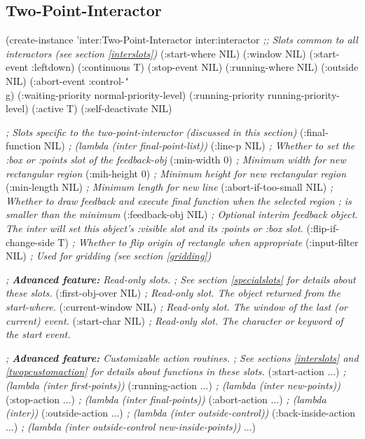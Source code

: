 \begin{group}
\section{Two-Point-Interactor}
\label{twopoint}

\begin{programexample}
(create-instance 'inter:Two-Point-Interactor inter:interactor
  {\it ;; Slots common to all interactors (see section \ref{interslots})}
  (:start-where NIL)
  (:window NIL)
  (:start-event :leftdown)
  (:continuous T)
  (:stop-event NIL)
  (:running-where NIL)
  (:outside NIL)
  (:abort-event :control-{\tt\char`\\}g)
  (:waiting-priority normal-priority-level)
  (:running-priority running-priority-level)
  (:active T)
  (:self-deactivate NIL)

  {\it ; Slots specific to the two-point-interactor (discussed in this section)}
  (:final-function NIL)      {\it ; (lambda (inter final-point-list))}
  (:line-p NIL)              {\it ; Whether to set the :box or :points slot of the feedback-obj}
  (:min-width 0)             {\it ; Minimum width for new rectangular region}
  (:mih-height 0)            {\it ; Minimum height for new rectangular region}
  (:min-length NIL)          {\it ; Minimum length for new line}
  (:abort-if-too-small NIL)  {\it ; Whether to draw feedback and execute final function when the selected region}
                             {\it ; is smaller than the minimum}
  (:feedback-obj NIL)        {\it ; Optional interim feedback object.  The inter will set this object's :visible slot}
                             {\it and its :points or :box slot.}
  (:flip-if-change-side T)   {\it ; Whether to flip origin of rectangle when appropriate}
  (:input-filter NIL)        {\it ; Used for gridding (see section \ref{gridding})}

  {\it ; {\bf Advanced feature:}  Read-only slots.}
  {\it ; See section \ref{specialslots} for details about these slots.}
  (:first-obj-over NIL)     {\it ; Read-only slot.  The object returned from the start-where.}
  (:current-window NIL)     {\it ; Read-only slot.  The window of the last (or current) event.}
  (:start-char NIL)         {\it ; Read-only slot.  The character or keyword of the start event.}

  {\it ; {\bf Advanced feature:} Customizable action routines.}
  {\it ; See sections \ref{interslots} and \ref{twopcustomaction} for details about functions in these slots.}
  (:start-action ...)       {\it ; (lambda (inter first-points))}
  (:running-action ...)     {\it ; (lambda (inter new-points))}
  (:stop-action ...)        {\it ; (lambda (inter final-points))}
  (:abort-action ...)       {\it ; (lambda (inter))}
  (:outside-action ...)     {\it ; (lambda (inter outside-control))}
  (:back-inside-action ...) {\it ; (lambda (inter outside-control new-inside-points))}
...)
\end{programexample}
\end{group}

